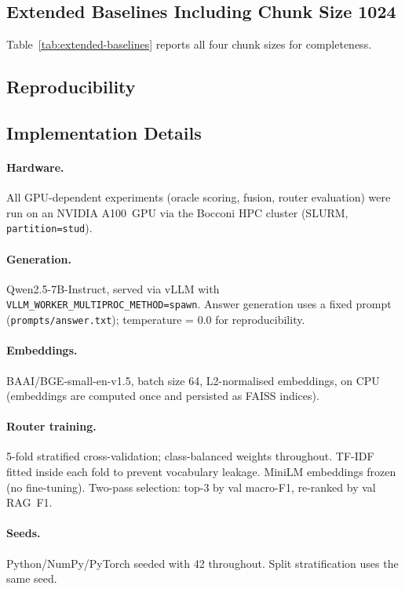 \documentclass{article}
\begin{document}
\subsection{Extended Baselines Including Chunk Size 1024}

Table~\ref{tab:extended-baselines} reports all four chunk sizes for
completeness.



\subsection{Reproducibility}



\subsection{Implementation Details}

\paragraph{Hardware.}
All GPU-dependent experiments (oracle scoring, fusion, router evaluation)
were run on an NVIDIA A100~GPU via the Bocconi HPC cluster (SLURM,
\texttt{partition=stud}).

\paragraph{Generation.}
Qwen2.5-7B-Instruct, served via vLLM with
\texttt{VLLM\_WORKER\_MULTIPROC\_METHOD=spawn}.
Answer generation uses a fixed prompt
(\texttt{prompts/answer.txt}); temperature = 0.0 for reproducibility.

\paragraph{Embeddings.}
BAAI/BGE-small-en-v1.5, batch size 64, L2-normalised embeddings,
on CPU (embeddings are computed once and persisted as FAISS indices).

\paragraph{Router training.}
5-fold stratified cross-validation; class-balanced weights throughout.
TF-IDF fitted inside each fold to prevent vocabulary leakage.
MiniLM embeddings frozen (no fine-tuning).
Two-pass selection: top-3 by val macro-F1, re-ranked by val RAG~F1.

\paragraph{Seeds.}
Python/NumPy/PyTorch seeded with 42 throughout.
Split stratification uses the same seed.
\end{document}
